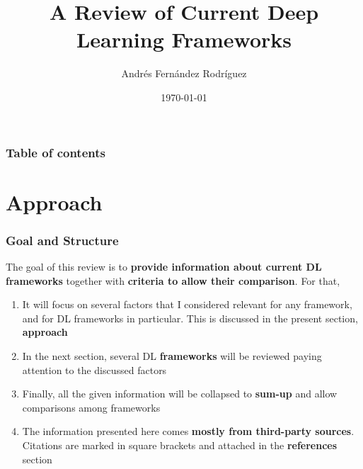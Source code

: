 \documentclass[hyperref={pdfpagelabels=false}]{beamer}
\title[Review of DL Frameworks]{A Review of Current Deep Learning Frameworks}
\author[Andr\'es Fern\'andez Rodr\'iguez]{Andr\'es Fern\'andez Rodr\'iguez}
\institute[]{Software Engineering and Computer Vision}
\date{\today}%
\begin{document}
     {\frame \titlepage}



     \begin{frame}
       \frametitle{Table of contents}
       \tableofcontents[hideallsubsections]
     \end{frame}




     \section{Approach}
     \frame{\sectionpage}

     \begin{frame}
       \frametitle{Goal and Structure}
       The goal of this review is to \textbf{provide information about current DL frameworks} together with \textbf{criteria to allow their comparison}. For that,
       \vspace{3mm}
       \begin{enumerate}[<.->]
       \item It will focus on several factors that I considered relevant for any framework, and for DL frameworks in particular. This is discussed in the present section, \textbf{approach}
       \item In the next section, several DL \textbf{frameworks} will be reviewed paying attention to the discussed factors
       \item Finally, all the given information will be collapsed to \textbf{sum-up} and allow comparisons among frameworks
       \item The information presented here comes \textbf{mostly from third-party sources}. Citations are marked in square brackets and attached in the \textbf{references} section
       \end{enumerate}

     \end{frame}
\end{document}
